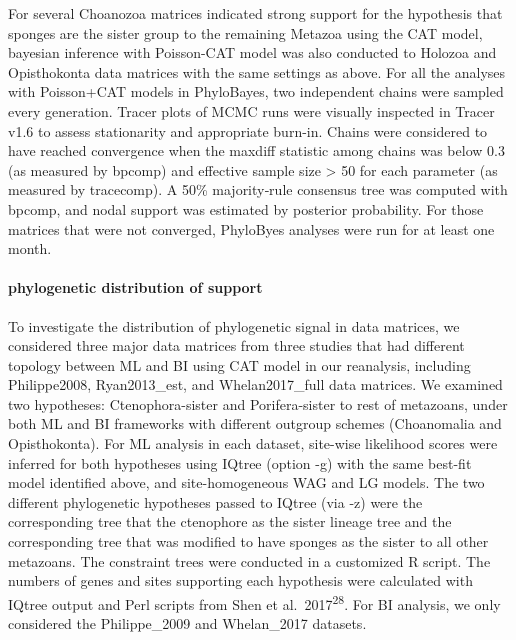 \documentclass[]{article}
\let\oldparagraph\paragraph
\renewcommand{\paragraph}[1]{\oldparagraph{#1}\mbox{}}
\begin{document}
For several Choanozoa matrices indicated strong support for the
hypothesis that sponges are the sister group to the remaining Metazoa
using the CAT model, bayesian inference with Poisson-CAT model was also
conducted to Holozoa and Opisthokonta data matrices with the same
settings as above. For all the analyses with Poisson+CAT models in
PhyloBayes, two independent chains were sampled every generation. Tracer
plots of MCMC runs were visually inspected in Tracer v1.6 to assess
stationarity and appropriate burn-in. Chains were considered to have
reached convergence when the maxdiff statistic among chains was below
0.3 (as measured by bpcomp) and effective sample size \textgreater{} 50
for each parameter (as measured by tracecomp). A 50\% majority‐rule
consensus tree was computed with bpcomp, and nodal support was estimated
by posterior probability. For those matrices that were not converged,
PhyloByes analyses were run for at least one month.

\hypertarget{phylogenetic-distribution-of-support}{%
\paragraph{phylogenetic distribution of
support}\label{phylogenetic-distribution-of-support}}

To investigate the distribution of phylogenetic signal in data matrices,
we considered three major data matrices from three studies that had
different topology between ML and BI using CAT model in our reanalysis,
including Philippe2008, Ryan2013\_est, and Whelan2017\_full data
matrices. We examined two hypotheses: Ctenophora-sister and
Porifera-sister to rest of metazoans, under both ML and BI frameworks
with different outgroup schemes (Choanomalia and Opisthokonta). For ML
analysis in each dataset, site-wise likelihood scores were inferred for
both hypotheses using IQtree (option -g) with the same best-fit model
identified above, and site-homogeneous WAG and LG models. The two
different phylogenetic hypotheses passed to IQtree (via -z) were the
corresponding tree that the ctenophore as the sister lineage tree and
the corresponding tree that was modified to have sponges as the sister
to all other metazoans. The constraint trees were conducted in a
customized R script. The numbers of genes and sites supporting each
hypothesis were calculated with IQtree output and Perl scripts from Shen
et al.~2017\textsuperscript{28}. For BI analysis, we only considered the
Philippe\_2009 and Whelan\_2017 datasets.
\end{document}
